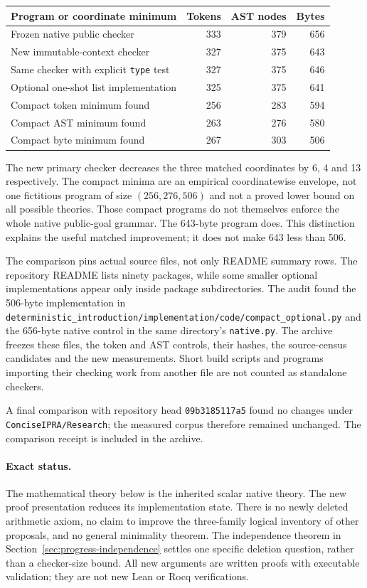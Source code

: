 \documentclass[11pt,a4paper]{article}
\theoremstyle{definition}\newtheorem{definition}[theorem]{Definition}
\theoremstyle{remark}\newtheorem{remark}[theorem]{Remark}
\begin{document}
\begin{center}
\begin{tabular}{lrrr}
\toprule
Program or coordinate minimum & Tokens & AST nodes & Bytes\\
\midrule
Frozen native public checker &333&379&656\\
New immutable-context checker &327&375&643\\
Same checker with explicit \texttt{type} test &327&375&646\\
Optional one-shot list implementation &325&375&641\\
\midrule
Compact token minimum found &256&283&594\\
Compact AST minimum found &263&276&580\\
Compact byte minimum found &267&303&506\\
\bottomrule
\end{tabular}
\end{center}
The new primary checker decreases the three matched coordinates by 6, 4
and 13 respectively. The compact minima are an empirical coordinatewise
envelope, not one fictitious program of size $(256,276,506)$ and not a
proved lower bound on all possible theories. Those compact programs do not
themselves enforce the whole native public-goal grammar. The 643-byte
program does. This distinction explains the useful matched improvement;
it does not make 643 less than 506.

The comparison pins actual source files, not only README summary rows.
The repository README lists ninety packages, while some smaller optional
implementations appear only inside package subdirectories. The audit found
the 506-byte implementation in
\texttt{deterministic\_introduction/implementation/code/compact\_optional.py}
and the 656-byte native control in the same directory's \texttt{native.py}.
The archive freezes these files, the token and AST controls, their hashes,
the source-census candidates and the new measurements. Short build scripts
and programs importing their checking work from another file are not
counted as standalone checkers.

A final comparison with repository head \texttt{09b3185117a5} found no
changes under \texttt{ConciseIPRA/Research}; the measured corpus therefore
remained unchanged. The comparison receipt is included in the archive.

\paragraph{Exact status.}
The mathematical theory below is the inherited scalar native theory.
The new proof presentation reduces its implementation state. There is
no newly deleted arithmetic axiom, no claim to improve the three-family
logical inventory of other proposals, and no general minimality theorem.
The independence theorem in Section~\ref{sec:progress-independence}
settles one specific deletion question, rather than a checker-size bound.
All new arguments are written proofs with executable validation; they are
not new Lean or Rocq verifications.
\end{document}
